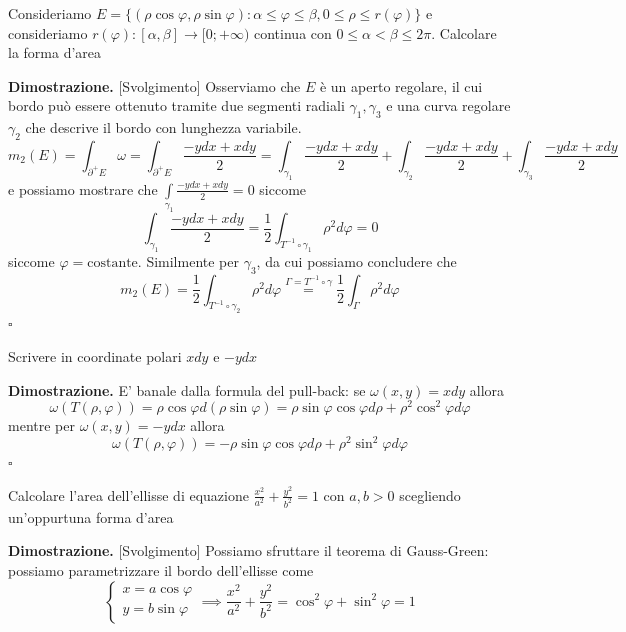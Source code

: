 %
\vspace{0.5cm}
\begin{example}[\textcolor{blue}{area di una regione tramite la $1-$forma d'area in coordinate polari}]
	Consideriamo $E = \{(\rho \cos{\varphi}, \rho \sin{\varphi}) : \alpha \leq \varphi \leq \beta, 0 \leq \rho \leq r(\varphi) \}$ e consideriamo $r(\varphi) : [\alpha, \beta] \to [0; +\infty)$ continua con $0 \leq \alpha < \beta \leq 2 \pi$. Calcolare la forma d'area
\end{example}
%
\noindent\textbf{Dimostrazione. } [Svolgimento]
	Osserviamo che $E$ è un aperto regolare, il cui bordo può essere ottenuto tramite due segmenti radiali $\gamma_1, \gamma_3$ e una curva regolare $\gamma_2$ che descrive il bordo con lunghezza variabile.
	$$
	m_2(E) = \int_{\partial^{+} E} \omega = \int_{\partial^{+} E} \frac{-ydx + xdy}{2} = \int_{\gamma_1} \frac{-ydx + xdy}{2} + \int_{\gamma_2} \frac{-ydx + xdy}{2} + \int_{\gamma_3} \frac{-ydx + xdy}{2}
	$$
	e possiamo mostrare che $
	\int\limits_{\gamma_1} \frac{-ydx + xdy}{2} = 0
	$
	siccome
	$$
	\int_{\gamma_1} \frac{-ydx + xdy}{2} = \frac{1}{2} \int_{T^{-1} \circ \gamma_1} \rho^2 d\varphi = 0 
	$$
	siccome $\varphi=\text{costante}$. Similmente per $\gamma_3$, da cui possiamo concludere che
	$$
	m_2(E) = \frac{1}{2} \int_{T^{-1} \circ \gamma_2} \rho^2 d\varphi \stackrel{\Gamma = T^{-1} \circ \gamma}{=} \frac{1}{2} \int_\Gamma \rho^2 d\varphi  
	$$
\hfill $\square$
%
\vspace{0.5cm}
\begin{exercise}
	Scrivere in coordinate polari $xdy$ e $-ydx$
\end{exercise}
%
\noindent\textbf{Dimostrazione. }
	E' banale dalla formula del pull-back: se $\omega(x, y) = xdy$ allora
	$$
	\omega(T(\rho, \varphi)) = \rho \cos{\varphi} d(\rho \sin{\varphi}) = \rho \sin{\varphi} \cos{\varphi} d\rho + \rho^2 \cos^2{\varphi} d\varphi  
	$$
	mentre per $\omega(x, y) = -ydx$ allora
	$$
	\omega(T(\rho, \varphi)) = -\rho \sin{\varphi} \cos{\varphi} d\rho + \rho^2 \sin^2{\varphi} d\varphi  
	$$
\hfill $\square$
%
\vspace{0.5cm}
\begin{exercise}
	Calcolare l'area dell'ellisse di equazione $\frac{x^2}{a^2} + \frac{y^2}{b^2} = 1$ con $a, b > 0$ scegliendo un'oppurtuna forma d'area
\end{exercise}
%
\noindent\textbf{Dimostrazione. }[Svolgimento]
	Possiamo sfruttare il teorema di Gauss-Green: possiamo parametrizzare il bordo dell'ellisse come
	$$
	\begin{cases}
		x = a \cos{\varphi} \\
		y = b \sin{\varphi}
	\end{cases} \implies \frac{x^2}{a^2} + \frac{y^2}{b^2} = \cos^2{\varphi} + \sin^2{\varphi} = 1
	$$
